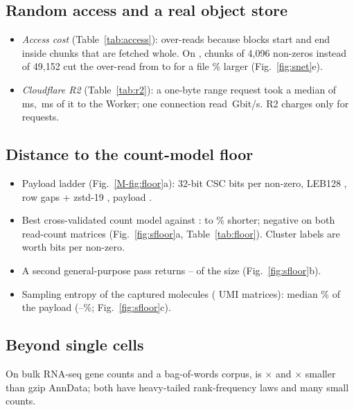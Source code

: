 \subsection{Random access and a real object store}
\begin{itemize}\itemsep 1pt
\item \emph{Access cost} (Table~\ref{tab:access}): \sone{} over-reads because blocks start and end inside chunks that are
  fetched whole. On , chunks of 4,096 non-zeros instead of 49,152 cut the over-read from
   to  for a file
  \% larger (Fig.~\ref{fig:snet}e).
\item \emph{Cloudflare R2} (Table~\ref{tab:r2}): a one-byte range request took a median of \,ms,
  \,ms of it to the Worker; one connection read \,Gbit/s. R2 charges only
  for requests.
\end{itemize}

\subsection{Distance to the count-model floor}
\label{sec:sfloor}
\begin{itemize}\itemsep 1pt
\item Payload ladder (Fig.~\ref{M-fig:floor}a): 32-bit CSC  bits per non-zero, LEB128
  , row gaps + zstd-19 , \sone{} payload .
\item Best cross-validated count model against \sone{}:  to \% shorter;
  negative on both read-count matrices (Fig.~\ref{fig:sfloor}a, Table~\ref{tab:floor}). Cluster labels are worth
   bits per non-zero.
\item A second general-purpose pass returns -- of the \sone{} size (Fig.~\ref{fig:sfloor}b).
\item Sampling entropy of the captured molecules ( UMI matrices): median \% of the
  payload (--\%; Fig.~\ref{fig:sfloor}c).
\end{itemize}

\subsection{Beyond single cells}
\label{sec:beyond}
On bulk RNA-seq gene counts and a bag-of-words corpus, \sone{} is $\times$ and
$\times$ smaller than gzip AnnData; both have heavy-tailed rank-frequency laws and
many small counts.
